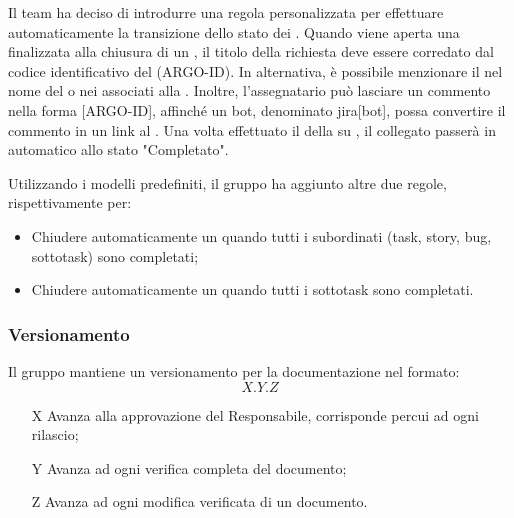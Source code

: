 \vspace{0.5\baselineskip}
\par Il team ha deciso di introdurre una regola personalizzata per effettuare automaticamente la transizione dello stato dei . Quando viene aperta una  finalizzata alla chiusura di un , il titolo della richiesta deve essere corredato dal codice identificativo del  (ARGO-ID). In alternativa, è possibile menzionare il  nel nome del  o nei  associati alla . Inoltre, l’assegnatario può lasciare un commento nella forma [ARGO-ID], affinché un bot, denominato jira[bot], possa convertire il commento in un link al  . Una volta effettuato il  della  su , il  collegato passerà in automatico allo stato "Completato".
\par Utilizzando i modelli predefiniti, il gruppo ha aggiunto altre due regole, rispettivamente per:
\begin{itemize}
  \item Chiudere automaticamente un  quando tutti i  subordinati (task, story, bug, sottotask) sono completati;
  \item Chiudere automaticamente un  quando tutti i sottotask sono completati.
\end{itemize}


\subsubsection{Versionamento}
Il gruppo mantiene un versionamento per la documentazione nel formato:
\[ X.Y.Z \]
\begin{itemize}
  \item[X] Avanza alla approvazione del Responsabile, corrisponde percui ad ogni rilascio;
  \item[Y] Avanza ad ogni verifica completa del documento;
  \item[Z] Avanza ad ogni modifica verificata di un documento.
\end{itemize}

